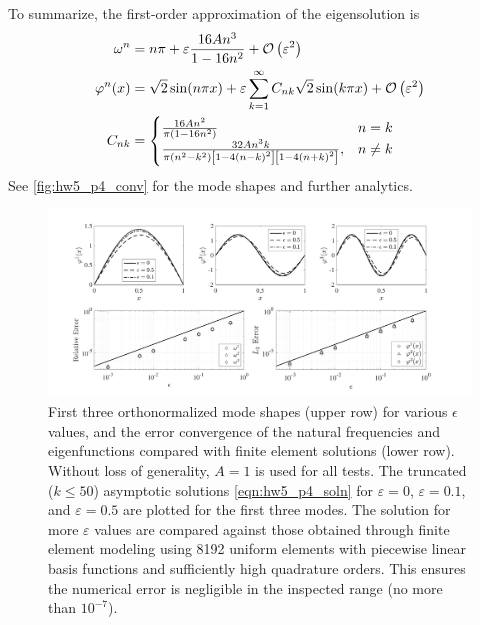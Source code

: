 \begin{enumerate}[(i)]
{    To summarize, the first-order approximation of the eigensolution is 
    \begin{equation}\label{eqn:hw5_p4_soln}
    \begin{aligned}
        \omega^n &= n\pi + \varepsilon \frac{16 A n^3}{1 - 16n^2} + \mathcal{O} \left( \varepsilon^2 \right) \\
        \varphi^n(x) &= \sqrt{2} \sin(n\pi x) + \varepsilon \sum_{k=1}^\infty C_{nk} \sqrt{2} \sin(k\pi x)  + \mathcal{O} \left( \varepsilon^2 \right) \\
        C_{nk} &= \begin{cases}
            \frac{16 A n^2}{\pi(1 - 16n^2)} & n = k \\
            \frac{32 A n^3 k}{\pi(n^2 - k^2)\left[1 - 4{(n-k)}^2\right] \left[1 - 4{(n+k)}^2\right]}, & n \neq k
        \end{cases}
    \end{aligned}
    \end{equation}
    See \cref{fig:hw5_p4_conv} for the mode shapes and further analytics.
}
\begin{figure}[!ht]
    \centering
    \includegraphics[width=\textwidth]{homework/hw5/assets/hw5_p4_conv.pdf}
    \caption{
        First three orthonormalized mode shapes (upper row) for various $\epsilon$ values, and the error convergence of the natural frequencies and eigenfunctions compared with finite element solutions (lower row). 
        Without loss of generality, $A = 1$ is used for all tests. 
        The truncated ($k \leq 50$) asymptotic solutions \cref{eqn:hw5_p4_soln} for $\varepsilon = 0$, $\varepsilon = 0.1$, and $\varepsilon = 0.5$ are plotted for the first three modes. 
        The solution for more $\varepsilon$ values are compared against those obtained through finite element modeling using 8192 uniform elements with piecewise linear basis functions and sufficiently high quadrature orders. 
        This ensures the numerical error is negligible in the inspected range (no more than $10^{-7}$). 
}
\end{figure}
\end{enumerate}
